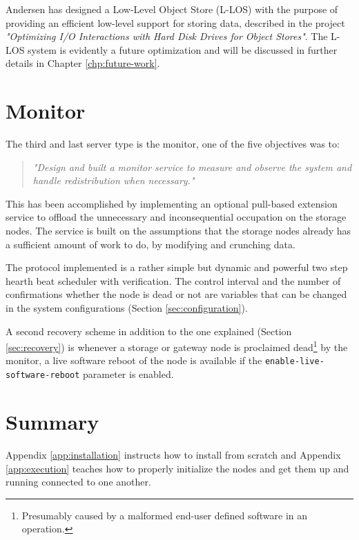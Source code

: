 Andersen has designed a Low-Level Object Store (L-LOS) with the purpose of providing an efficient low-level support for storing data, described in the project \textit{"Optimizing I/O Interactions with Hard Disk Drives for Object Stores"}\cite{andersen2016}. The L-LOS system is evidently a future optimization and will be discussed in further details in Chapter \ref{chp:future-work}. 

\section{Monitor} \label{sec:monitor}
The third and last server type is the monitor, one of the five objectives was to:

\begin{quotation}
	\textit{"Design and built a monitor service to measure and observe the system and handle redistribution when necessary."}
\end{quotation}

This has been accomplished by implementing an optional pull-based extension service to offload the unnecessary and inconsequential 	occupation on the storage nodes. The service is built on the assumptions that the storage nodes already has a sufficient amount of work to do, by modifying and crunching data.
\newline

The protocol implemented is a rather simple but dynamic and powerful two step hearth beat scheduler with verification. The control interval and the number of confirmations whether the node is dead or not are variables that can be changed in the system configurations (Section \ref{sec:configuration}). 
\newpage

A second recovery scheme in addition to the one explained (Section \ref{sec:recovery}) is whenever a storage or gateway node is proclaimed dead\footnote{Presumably caused by a malformed end-user defined software in an operation.} by the monitor, a live software reboot of the node is available if the \texttt{enable-live-software-reboot} parameter is enabled.

\section{Summary}
Appendix \ref{app:installation} instructs how to install \CodeName from scratch and Appendix \ref{app:execution} teaches how to properly initialize the nodes and get them up and running connected to one another.